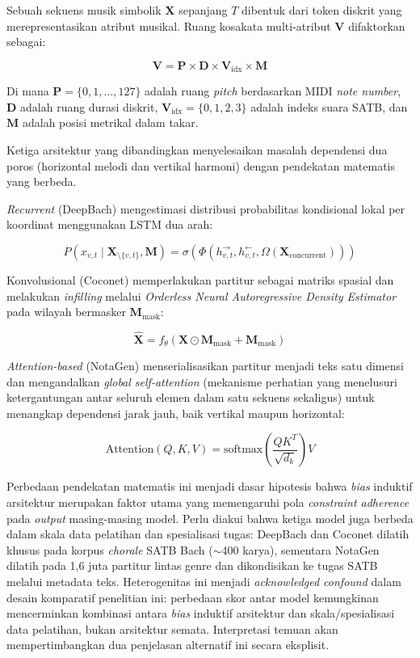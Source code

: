 Sebuah sekuens musik simbolik $\mathbf{X}$ sepanjang $T$ dibentuk dari token diskrit yang merepresentasikan atribut musikal. Ruang kosakata multi-atribut $\mathbf{V}$ difaktorkan sebagai:

\[
\mathbf{V} = \mathbf{P} \times \mathbf{D} \times \mathbf{V}_{\text{idx}} \times \mathbf{M}
\]

Di mana $\mathbf{P} = \{0, 1, \dots, 127\}$ adalah ruang \textit{pitch} berdasarkan MIDI \textit{note number}, $\mathbf{D}$ adalah ruang durasi diskrit, $\mathbf{V}_{\text{idx}} = \{0,1,2,3\}$ adalah indeks suara SATB, dan $\mathbf{M}$ adalah posisi metrikal dalam takar.

Ketiga arsitektur yang dibandingkan menyelesaikan masalah dependensi dua poros (horizontal melodi dan vertikal harmoni) dengan pendekatan matematis yang berbeda.

\textit{Recurrent} (DeepBach) mengestimasi distribusi probabilitas kondisional lokal per koordinat menggunakan LSTM dua arah:

\[
P(x_{v,t} \mid \mathbf{X}_{\setminus \{v,t\}}, \mathbf{M}) = \sigma\left(\Phi(h_{v,t}^{\rightarrow}, h_{v,t}^{\leftarrow}, \Omega(\mathbf{X}_{\text{concurrent}}))\right)
\]

Konvolusional (Coconet) memperlakukan partitur sebagai matriks spasial dan melakukan \textit{infilling} melalui \textit{Orderless Neural Autoregressive Density Estimator} pada wilayah bermasker $\mathbf{M}_{\text{mask}}$:

\[
\hat{\mathbf{X}} = f_{\theta}(\mathbf{X} \odot \mathbf{M}_{\text{mask}} + \mathbf{M}_{\text{mask}})
\]

\textit{Attention-based} (NotaGen) menserialisasikan partitur menjadi teks satu dimensi dan mengandalkan \textit{global self-attention} (mekanisme perhatian yang menelusuri ketergantungan antar seluruh elemen dalam satu sekuens sekaligus) untuk menangkap dependensi jarak jauh, baik vertikal maupun horizontal:

\[
\text{Attention}(Q, K, V) = \text{softmax}\left(\frac{QK^T}{\sqrt{d_k}}\right)V
\]

Perbedaan pendekatan matematis ini menjadi dasar hipotesis bahwa \textit{bias} induktif arsitektur merupakan faktor utama yang memengaruhi pola \textit{constraint adherence} pada \textit{output} masing-masing model. Perlu diakui bahwa ketiga model juga berbeda dalam skala data pelatihan dan spesialisasi tugas: DeepBach dan Coconet dilatih khusus pada korpus \textit{chorale} SATB Bach ($\sim$400 karya), sementara NotaGen dilatih pada 1,6 juta partitur lintas genre dan dikondisikan ke tugas SATB melalui metadata teks. Heterogenitas ini menjadi \textit{acknowledged confound} dalam desain komparatif penelitian ini: perbedaan skor antar model kemungkinan mencerminkan kombinasi antara \textit{bias} induktif arsitektur dan skala/spesialisasi data pelatihan, bukan arsitektur semata. Interpretasi temuan akan mempertimbangkan dua penjelasan alternatif ini secara eksplisit.
